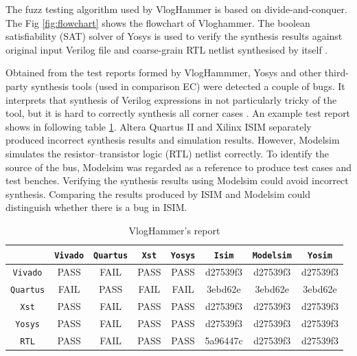 The fuzz testing algorithm used by VlogHammer is based on divide-and-conquer. The Fig \ref{fig:flowchart} shows the flowchart of Vloghammer. The boolean satisfiability (SAT) solver of Yosys is used to verify the synthesis results against original input Verilog file and coarse-grain RTL netlist synthesised by itself \cite{clifford,wolf2016yosys}.

Obtained from the test reports formed by VlogHammmer, Yosys and other third-party synthesis tools (used in comparison EC) were detected a couple of bugs. It interprets that synthesis of Verilog expressions in not particularly tricky of the tool, but it is hard to correctly synthesis all corner cases \cite{clifford}. An example test report shows in following table \ref{tab:Vloghammer}. Altera Quartus II and Xilinx ISIM separately produced incorrect synthesis results and simulation results. However, Modelsim simulates the resistor–transistor logic (RTL) netlist correctly. To identify the source of the bus, Modelsim was regarded as a reference to produce test cases and test benches. Verifying the synthesis results using Modelsim could avoid incorrect synthesis. Comparing the results produced by ISIM and Modelsim could distinguish whether there is a bug in ISIM.

\begin{table}[htb]
    \centering
    \begin{tabular}{c|ccccccc}
    \hline
         &\texttt{Vivado}& \texttt{Quartus}&\texttt{Xst}&\texttt{Yosys}&\texttt{Isim}&\texttt{Modelsim}&\texttt{Yosim} \\
         \hline
      \texttt{Vivado}&PASS&FAIL&PASS&PASS&d27539f3&d27539f3&d27539f3\\
      \texttt{Quartus}&FAIL&PASS&FAIL&FAIL&3ebd62e&3ebd62e&3ebd62e\\
      \texttt{Xst}&PASS&FAIL&PASS&PASS&d27539f3&d27539f3&d27539f3\\
      \texttt{Yosys}&PASS&FAIL&PASS&PASS&d27539f3&d27539f3&d27539f3\\
      \texttt{RTL}&PASS&FAIL&PASS&PASS&5a96447c&d27539f3&d27539f3\\
      \hline
    \end{tabular}
    \caption{\footnotesize VlogHammer's report\cite{clifford}}
    \label{tab:Vloghammer}
\end{table}

